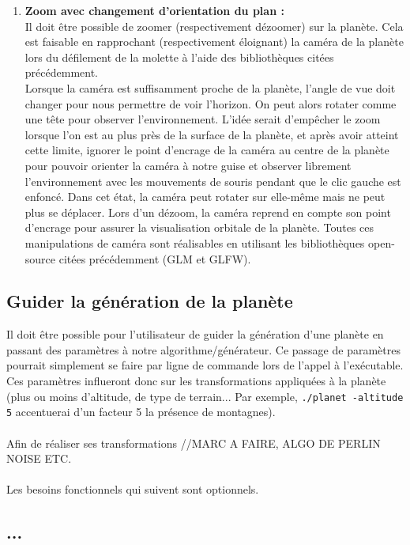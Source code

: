 \documentclass[a4paper]{article}
\begin{document}
\begin{enumerate}
        \item \textbf{Zoom avec changement d'orientation du plan :} \\
        Il doit être possible de zoomer (respectivement dézoomer) sur la planète. Cela est faisable en rapprochant (respectivement éloignant) la caméra de la planète lors du défilement de la molette à l'aide des bibliothèques citées précédemment.\\
        Lorsque la caméra est suffisamment proche de la planète, l'angle de vue doit changer pour nous permettre de voir l'horizon. On peut alors rotater comme une tête pour observer l'environnement. L'idée serait d'empêcher le zoom lorsque l'on est au plus près de la surface de la planète, et après avoir atteint cette limite, ignorer le point d'encrage de la caméra au centre de la planète pour pouvoir orienter la caméra à notre guise et observer librement l'environnement avec les mouvements de souris pendant que le clic gauche est enfoncé. Dans cet état, la caméra peut rotater sur elle-même mais ne peut plus se déplacer. Lors d'un dézoom, la caméra reprend en compte son point d'encrage pour assurer la visualisation orbitale de la planète. Toutes ces manipulations de caméra sont réalisables en utilisant les bibliothèques open-source citées précédemment (GLM et GLFW).
        
\end{enumerate}


\subsection{Guider la génération de la planète}

Il doit être possible pour l'utilisateur de guider la génération d'une planète en passant des paramètres à notre algorithme/générateur. Ce passage de paramètres pourrait simplement se faire par ligne de commande lors de l'appel à l'exécutable. Ces paramètres influeront donc sur les transformations appliquées à la planète (plus ou moins d'altitude, de type de terrain... Par exemple, \verb|./planet -altitude 5| accentuerai d'un facteur 5 la présence de montagnes).\\
\\
Afin de réaliser ses transformations //MARC A FAIRE, ALGO DE PERLIN NOISE ETC.\\
\\
Les besoins fonctionnels qui suivent sont optionnels.

\subsection{...}
\end{document}
